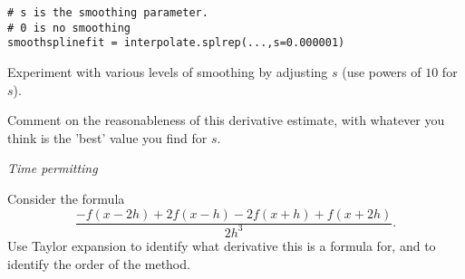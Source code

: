 \documentclass[12pt,letterpaper,noanswers]{exam}
\begin{document}
\begin{questions}
\begin{parts}
\begin{verbatim}
# s is the smoothing parameter.
# 0 is no smoothing
smoothsplinefit = interpolate.splrep(...,s=0.000001)
\end{verbatim}

Experiment with various levels of smoothing by adjusting $s$ (use powers of $10$ for $s$).

Comment on the reasonableness of this derivative estimate, with whatever you think is the 'best' value you find for $s$.

\end{parts}


\question \emph{Time permitting} 

Consider the formula \[\frac{-f(x-2h) + 2f(x-h) -2f(x+h) + f(x+2h)}{2h^3}.\]  Use Taylor expansion to identify what derivative this is a formula for, and to identify the order of the method.
\end{questions}
\end{document}

